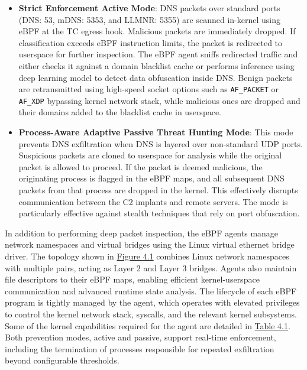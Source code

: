 \documentclass [11pt, proquest] {uwthesis}[2020/02/24]
\begin{document}
\begin{itemize}[itemsep=1pt,parsep=0pt]
    \item \textbf{Strict Enforcement Active Mode}: DNS packets over standard ports (DNS: 53, mDNS: 5353, and LLMNR: 5355) are scanned in-kernel using eBPF at the TC egress hook. Malicious packets are immediately dropped. If classification exceeds eBPF instruction limits, the packet is redirected to userspace for further inspection. The eBPF agent sniffs redirected traffic and either checks it against a domain blacklist cache or performs inference using deep learning model to detect data obfuscation inside DNS. Benign packets are retransmitted using high-speed socket options such as \texttt{AF\_PACKET} or \texttt{AF\_XDP} bypassing kernel network stack, while malicious ones are dropped and their domains added to the blacklist cache in userspace.
    
    \item \textbf{Process-Aware Adaptive Passive Threat Hunting Mode}: This mode prevents DNS exfiltration when DNS is layered over non-standard UDP ports. Suspicious packets are cloned to userspace for analysis while the original packet is allowed to proceed. If the packet is deemed malicious, the originating process is flagged in the eBPF maps, and all subsequent DNS packets from that process are dropped in the kernel. This effectively disrupts communication between the C2 implants and remote servers. The mode is particularly effective against stealth techniques that rely on port obfuscation.
    
\end{itemize}
\newpage
In addition to performing deep packet inspection, the eBPF agents manage network namespaces and virtual bridges using the Linux virtual ethernet bridge driver. The topology shown in \hyperref[sec:dp_eBPF_agent_net_topology]{Figure 4.1} combines Linux network namespaces with multiple pairs, acting as Layer 2 and Layer 3 bridges. Agents also maintain file descriptors to their eBPF maps, enabling efficient kernel-userspace communication and advanced runtime state analysis. The lifecycle of each eBPF program is tightly managed by the agent, which operates with elevated privileges to control the kernel network stack, syscalls, and the relevant kernel subsystems. Some of the kernel capabilities required for the agent are detailed in \hyperref[sec:dp_kernel_cap]{Table 4.1}. Both prevention modes, active and passive, support real-time enforcement, including the termination of processes responsible for repeated exfiltration beyond configurable thresholds.
\end{document}
